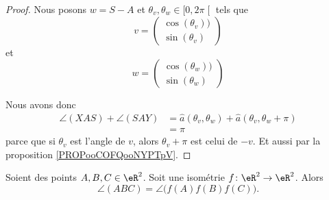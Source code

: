 \begin{proof}
	Nous posons \( w=S-A\) et \( \theta_v,\theta_w\in\mathopen[ 0,2\pi\mathclose[\) tels que
	\begin{equation}
		v=\begin{pmatrix}
			\cos(\theta_v)) \\
			\sin(\theta_v)
		\end{pmatrix}
	\end{equation}
	et
	\begin{equation}
		w=\begin{pmatrix}
			\cos(\theta_w)) \\
			\sin(\theta_w)
		\end{pmatrix}
	\end{equation}

	Nous avons donc
	\begin{subequations}
		\begin{align}
			\angle(XAS)+\angle(SAY) & =\hat a(\theta_v,\theta_w)+\hat a(\theta_v,\theta_w+\pi) \\
			                        & =\pi
		\end{align}
	\end{subequations}
	parce que si \( \theta_v\) est l'angle de \( v\), alors \( \theta_v+\pi\) est celui de \( -v\). Et aussi par la proposition \ref{PROPooCOFQooNYPTpV}.
\end{proof}


\begin{proposition}	\label{PROPooQHRJooHVqEOu}
	Soient des points \( A,B,C\in \eR^2\). Soit une isométrie \(f \colon \eR^2\to \eR^2  \). Alors
	\begin{equation}
		\angle(ABC)=\angle\big( f(A)f(B)f(C) \big).
	\end{equation}
\end{proposition}

